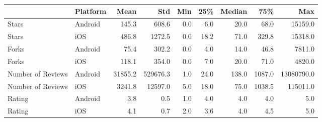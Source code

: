 \begin{tabular}{llrrrrrrr}
\hline
                   & Platform   &    Mean &      Std &   Min &   25\% &   Median &    75\% &        Max \\
\hline
 Stars             & Android    &   145.3 &    608.6 &   0.0 &   6.0 &     20.0 &   68.0 &    15159.0 \\
 Stars             & iOS        &   486.8 &   1272.5 &   0.0 &  18.2 &     71.0 &  329.8 &    15318.0 \\
 Forks             & Android    &    75.4 &    302.2 &   0.0 &   4.0 &     14.0 &   46.8 &     7811.0 \\
 Forks             & iOS        &   118.1 &    354.0 &   0.0 &   7.0 &     20.0 &   71.0 &     4820.0 \\
 Number of Reviews & Android    & 31855.2 & 529676.3 &   1.0 &  24.0 &    138.0 & 1087.0 & 13080790.0 \\
 Number of Reviews & iOS        &  3241.8 &  12597.0 &   5.0 &  18.0 &     75.0 & 1038.5 &   115011.0 \\
 Rating            & Android    &     3.8 &      0.5 &   1.0 &   4.0 &      4.0 &    4.0 &        5.0 \\
 Rating            & iOS        &     4.1 &      0.7 &   2.0 &   3.6 &      4.0 &    4.5 &        5.0 \\
\hline
\end{tabular}